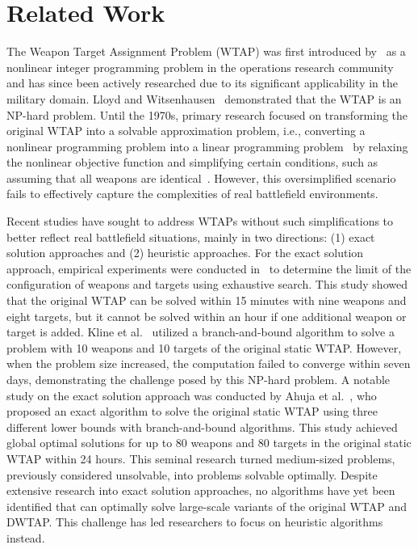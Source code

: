 \documentclass[smallcondensed]{svjour3}
\begin{document}
\section{Related Work}
\label{sec:related}

The Weapon Target Assignment Problem (WTAP) was first introduced by~\cite{manne1958target} as a nonlinear integer programming problem in the operations research community and has since been actively researched due to its significant applicability in the military domain. Lloyd and Witsenhausen~\cite{lloyd1986weapons} demonstrated that the WTAP is an NP-hard problem. Until the 1970s, primary research focused on transforming the original WTAP into a solvable approximation problem, i.e., converting a nonlinear programming problem into a linear programming problem~\cite{day1966allocating,firstman1960approximating,hodson1971linear,bracken1968selected,manne1958target,denbroeder1959optimum} by relaxing the nonlinear objective function and simplifying certain conditions, such as assuming that all weapons are identical~\cite{manne1958target,denbroeder1959optimum}. However, this oversimplified scenario fails to effectively capture the complexities of real battlefield environments.

Recent studies have sought to address WTAPs without such simplifications to better reflect real battlefield situations, mainly in two directions: (1) exact solution approaches and (2) heuristic approaches. For the exact solution approach, empirical experiments were conducted in~\cite{johansson2009empirical} to determine the limit of the configuration of weapons and targets using exhaustive search. This study showed that the original WTAP can be solved within 15 minutes with nine weapons and eight targets, but it cannot be solved within an hour if one additional weapon or target is added. Kline et al.~\cite{kline2019weapon} utilized a branch-and-bound algorithm to solve a problem with 10 weapons and 10 targets of the original static WTAP. However, when the problem size increased, the computation failed to converge within seven days, demonstrating the challenge posed by this NP-hard problem. A notable study on the exact solution approach was conducted by Ahuja et al.~\cite{ahuja2007exact}, who proposed an exact algorithm to solve the original static WTAP using three different lower bounds with branch-and-bound algorithms. This study achieved global optimal solutions for up to 80 weapons and 80 targets in the original static WTAP within 24 hours. This seminal research turned medium-sized problems, previously considered unsolvable, into problems solvable optimally. Despite extensive research into exact solution approaches, no algorithms have yet been identified that can optimally solve large-scale variants of the original WTAP and DWTAP. This challenge has led researchers to focus on heuristic algorithms instead.
\end{document}
